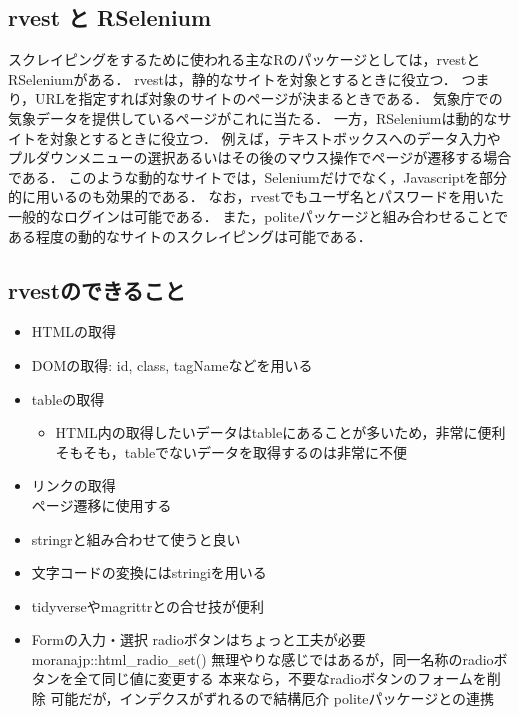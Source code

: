 \documentclass[
]{article}
\providecommand{\tightlist}{%
  \setlength{\itemsep}{0pt}\setlength{\parskip}{0pt}}
\begin{document}
\hypertarget{rvest-ux3068-rselenium}{%
\subsection{rvest と RSelenium}\label{rvest-ux3068-rselenium}}

スクレイピングをするために使われる主なRのパッケージとしては，rvestとRSeleniumがある．
rvestは，静的なサイトを対象とするときに役立つ．
つまり，URLを指定すれば対象のサイトのページが決まるときである．
気象庁での気象データを提供しているページがこれに当たる．
一方，RSeleniumは動的なサイトを対象とするときに役立つ．
例えば，テキストボックスへのデータ入力やプルダウンメニューの選択あるいはその後のマウス操作でページが遷移する場合である．
このような動的なサイトでは，Seleniumだけでなく，Javascriptを部分的に用いるのも効果的である．
なお，rvestでもユーザ名とパスワードを用いた一般的なログインは可能である．
また，politeパッケージと組み合わせることである程度の動的なサイトのスクレイピングは可能である．

\hypertarget{rvestux306eux3067ux304dux308bux3053ux3068}{%
\subsection{rvestのできること}\label{rvestux306eux3067ux304dux308bux3053ux3068}}

\begin{itemize}
\tightlist
\item
  HTMLの取得\\
\item
  DOMの取得: id, class, tagNameなどを用いる\\
\item
  tableの取得

  \begin{itemize}
  \tightlist
  \item
    HTML内の取得したいデータはtableにあることが多いため，非常に便利
    そもそも，tableでないデータを取得するのは非常に不便
  \end{itemize}
\item
  リンクの取得\\
  ページ遷移に使用する\\
\item
  stringrと組み合わせて使うと良い\\
\item
  文字コードの変換にはstringiを用いる\\
\item
  tidyverseやmagrittrとの合せ技が便利\\
\item
  Formの入力・選択
  radioボタンはちょっと工夫が必要
  moranajp::html\_radio\_set()
  無理やりな感じではあるが，同一名称のradioボタンを全て同じ値に変更する
  本来なら，不要なradioボタンのフォームを削除
  可能だが，インデクスがずれるので結構厄介
  politeパッケージとの連携
\end{itemize}
\end{document}

